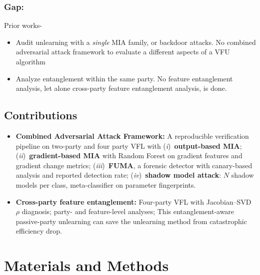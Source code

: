 \documentclass[sigconf,nonacm]{acmart}
\begin{document}
\subsubsection{Gap: }Prior works-
\begin{itemize}[leftmargin=*]
    \item {Audit unlearning with a \emph{single} MIA family, or backdoor attacks. No combined adversarial attack framework to evaluate a different aspects of a VFU algorithm}
\end{itemize}
\begin{itemize}[leftmargin=*]
    \item {Analyze entanglement within the same party. No feature entanglement analysis, let alone cross-party feature entanglement analysis, is done.}
\end{itemize}

\subsection{Contributions}
\begin{itemize}[leftmargin=*]
  \item \textbf{Combined Adversarial Attack Framework:} A reproducible verification pipeline on two-party and four party VFL with (\textit{i})~\textbf{output-based MIA}; (\textit{ii})~\textbf{gradient-based MIA} with Random Forest on gradient features and gradient change metrics; (\textit{iii})~\textbf{FUMA}, a forensic detector with canary-based analysis and reported detection rate; (\textit{iv})~\textbf{shadow model attack}: $N$ shadow models per class, meta-classifier on parameter fingerprints.
  
  \item \textbf{Cross-party feature entanglement:} Four-party VFL with Jacobian--SVD $\rho$ diagnosis; party- and feature-level analyses; This entanglement-aware passive-party unlearning can save the unlearning method from catastrophic efficiency drop.

\end{itemize}

\section{Materials and Methods}
\label{sec:methods}
\end{document}
